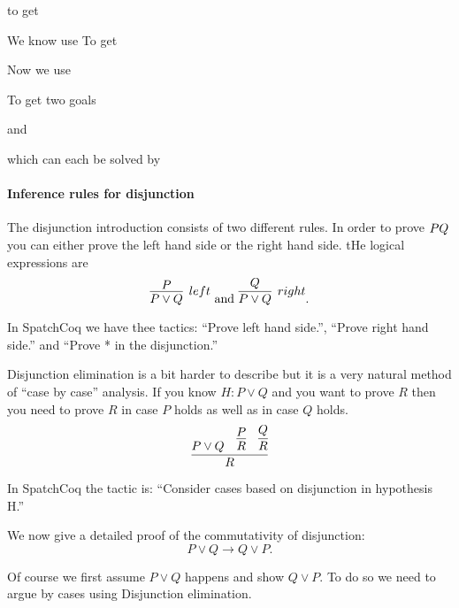 \begin{itemize}
to get

We know use
To get

Now we use 


To get two goals

and


which can each be solved by






\paragraph{Inference rules for disjunction}

The disjunction introduction consists of two different rules. In order to prove $P\/Q$ you can either prove the left hand side or the right hand side.  tHe logical expressions are
$$\infer[left]{P\lor Q}{P} \mbox{ and } \infer[right]{P\lor Q}{Q}.$$

In SpatchCoq we have thee tactics: ``Prove left hand side.'', ``Prove right hand side.'' and 
``Prove * in the disjunction.''

Disjunction elimination is a bit harder to describe but it is a very natural method of ``case by case'' analysis. If you know $H: P\lor Q$ and you  want to prove $R$ then you need to prove $R$ in case $P$ holds as well as in case $Q$ holds.
$$\infer{R}{P\lor Q &\infer{R}{P} & \infer{R}{Q}}$$

In SpatchCoq the tactic is: ``Consider cases based on disjunction in hypothesis H.''

We now give a detailed proof of the commutativity of disjunction:
$$P\lor Q \rightarrow Q\lor P.$$ 

Of course we first assume $P\lor Q$ happens and show $Q \lor P$. To do so we need to argue by cases using Disjunction elimination.


\end{itemize}
